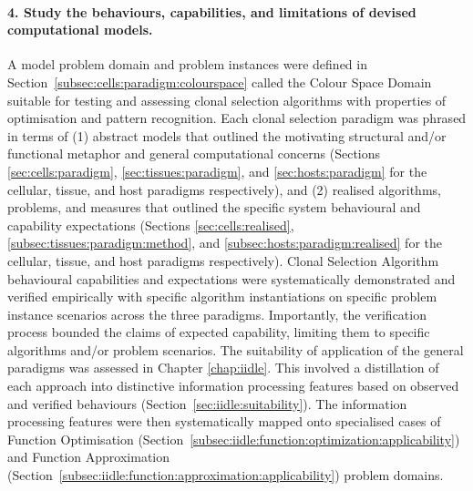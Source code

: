 \paragraph{4. Study the behaviours, capabilities, and limitations of devised computational models.}
A model problem domain and problem instances were defined in Section~\ref{subsec:cells:paradigm:colourspace} called the Colour Space Domain suitable for testing and assessing clonal selection algorithms with properties of optimisation and pattern recognition. 
Each clonal selection paradigm was phrased in terms of (1) abstract models that outlined the motivating structural and/or functional metaphor and general computational concerns (Sections \ref{sec:cells:paradigm}, \ref{sec:tissues:paradigm}, and \ref{sec:hosts:paradigm} for the cellular, tissue, and host paradigms respectively), and (2) realised algorithms, problems, and measures that outlined the specific system behavioural and capability expectations (Sections \ref{sec:cells:realised}, \ref{subsec:tissues:paradigm:method}, and \ref{subsec:hosts:paradigm:realised} for the cellular, tissue, and host paradigms respectively). 
Clonal Selection Algorithm behavioural capabilities and expectations were systematically demonstrated and verified empirically with specific algorithm instantiations on specific problem instance scenarios across the three paradigms. Importantly, the verification process bounded the claims of expected capability, limiting them to specific algorithms and/or problem scenarios.
The suitability of application of the general paradigms was assessed in Chapter \ref{chap:iidle}. This involved a distillation of each approach into distinctive information processing features based on observed and verified behaviours (Section~\ref{sec:iidle:suitability}). The information processing features were then systematically mapped onto specialised cases of Function Optimisation (Section~\ref{subsec:iidle:function:optimization:applicability}) and Function Approximation (Section~\ref{subsec:iidle:function:approximation:applicability}) problem domains.

